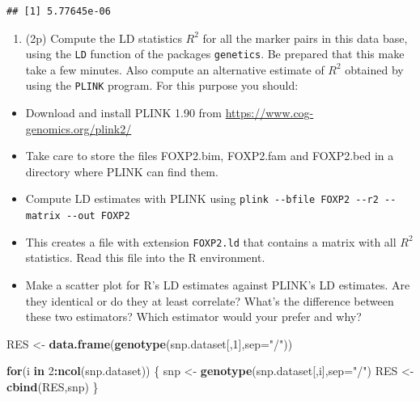 \documentclass[
]{article}
\newenvironment{Shaded}{\begin{snugshade}}{\end{snugshade}}
\newcommand{\ControlFlowTok}[1]{\textcolor[rgb]{0.13,0.29,0.53}{\textbf{#1}}}
\newcommand{\DataTypeTok}[1]{\textcolor[rgb]{0.13,0.29,0.53}{#1}}
\newcommand{\DecValTok}[1]{\textcolor[rgb]{0.00,0.00,0.81}{#1}}
\newcommand{\KeywordTok}[1]{\textcolor[rgb]{0.13,0.29,0.53}{\textbf{#1}}}
\newcommand{\NormalTok}[1]{#1}
\newcommand{\OperatorTok}[1]{\textcolor[rgb]{0.81,0.36,0.00}{\textbf{#1}}}
\newcommand{\StringTok}[1]{\textcolor[rgb]{0.31,0.60,0.02}{#1}}
\providecommand{\tightlist}{%
  \setlength{\itemsep}{0pt}\setlength{\parskip}{0pt}}
\begin{document}
\begin{Shaded}
\end{Shaded}

\begin{verbatim}
## [1] 5.77645e-06
\end{verbatim}

\begin{enumerate}
\def\labelenumi{\arabic{enumi}.}
\setcounter{enumi}{6}
\tightlist
\item
  (2p) Compute the LD statistics \(R^2\) for all the marker pairs in
  this data base, using the \texttt{LD} function of the packages
  \texttt{genetics}. Be prepared that this make take a few minutes. Also
  compute an alternative estimate of \(R^2\) obtained by using the
  \texttt{PLINK} program. For this purpose you should:
\end{enumerate}

\begin{itemize}
\item
  Download and install PLINK 1.90 from
  \url{https://www.cog-genomics.org/plink2/}
\item
  Take care to store the files FOXP2.bim, FOXP2.fam and FOXP2.bed in a
  directory where PLINK can find them.
\item
  Compute LD estimates with PLINK using
  \texttt{plink\ -\/-bfile\ FOXP2\ -\/-r2\ -\/-matrix\ -\/-out\ FOXP2}
\item
  This creates a file with extension \texttt{FOXP2.ld} that contains a
  matrix with all \(R^2\) statistics. Read this file into the R
  environment.
\item
  Make a scatter plot for R's LD estimates against PLINK's LD estimates.
  Are they identical or do they at least correlate? What's the
  difference between these two estimators? Which estimator would your
  prefer and why?
\end{itemize}

\begin{Shaded}
\begin{Highlighting}[]
\NormalTok{RES <-}\StringTok{ }\KeywordTok{data.frame}\NormalTok{(}\KeywordTok{genotype}\NormalTok{(snp.dataset[,}\DecValTok{1}\NormalTok{],}\DataTypeTok{sep=}\StringTok{"/"}\NormalTok{))}

\ControlFlowTok{for}\NormalTok{(i }\ControlFlowTok{in} \DecValTok{2}\OperatorTok{:}\KeywordTok{ncol}\NormalTok{(snp.dataset)) \{}
\NormalTok{   snp <-}\StringTok{ }\KeywordTok{genotype}\NormalTok{(snp.dataset[,i],}\DataTypeTok{sep=}\StringTok{"/"}\NormalTok{)}
\NormalTok{   RES <-}\StringTok{ }\KeywordTok{cbind}\NormalTok{(RES,snp)}
\NormalTok{\}}
\end{Highlighting}
\end{Shaded}
\end{document}
